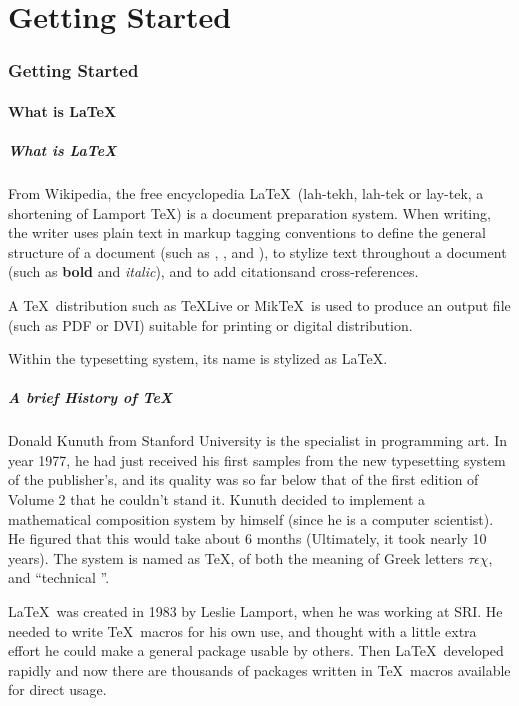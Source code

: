 \part{Getting Started}

\section{Getting Started}
\begin{frame}
\end{frame}

\subsection{What is \LaTeX}

\begin{frame}
	\frametitle{What is \LaTeX}
	\begin{block}{From Wikipedia, the free encyclopedia\footnotemark[1]}
		\LaTeX\ (lah-tekh, lah-tek or lay-tek, a shortening of Lamport \TeX) is a document preparation system. When writing, the writer uses plain text in markup tagging conventions to define the general structure of a document (such as , , and ), to stylize text throughout a document (such as \textbf{bold} and \textit{italic}), and to add citations\footnotemark[1] and cross-references. \medskip
		
		A \TeX\ distribution such as \TeX Live or Mik\TeX\ is used to produce an output file (such as PDF or DVI) suitable for printing or digital distribution. \medskip
		
		Within the typesetting system, its name is stylized as \LaTeX.	
	\end{block}
	

\end{frame}

\begin{frame}
	\frametitle{A brief History of \TeX}
	Donald Kunuth from Stanford University is the specialist in programming art. In year 1977, he had just received his first samples from the new typesetting system of the publisher's, and its quality was so far below that of the first edition of Volume 2 that he couldn't stand it. Kunuth decided to implement a mathematical composition system by himself (since he is a computer scientist). He figured that this would take about 6 months (Ultimately, it took nearly 10 years). The system is named as \TeX, of both the meaning of Greek letters $\tau\epsilon\chi$, and ``technical ''. \medskip
	
	\LaTeX\ was created in 1983 by Leslie Lamport, when he was working at SRI. He needed to write \TeX\ macros for his own use, and thought with a little extra effort he could make a general package usable by others. Then \LaTeX\  developed rapidly and now there are thousands of packages written in \TeX\ macros available for direct usage.
	
\end{frame}

